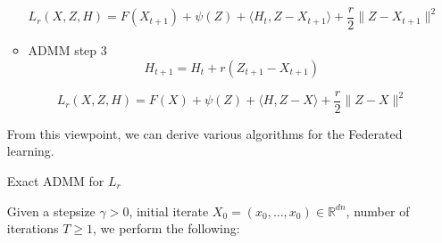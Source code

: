 \begin{itemize}
\begin{itemize}
    \begin{equation}
    L_r(X,Z,H) = F(X_{t+1}) +\psi(Z) + \langle H_t,Z-X_{t+1} \rangle + \frac{r}{2} \|Z-X_{t+1} \|^2
    \end{equation}
    
    \item ADMM step 3
    \begin{equation}
        H_{t+1} = H_t + r (Z_{t+1} - X_{t+1})
    \end{equation}
    
    \begin{equation}
    L_r(X,Z,H) = F(X) +\psi(Z) + \langle H,Z-X \rangle + \frac{r}{2} \|Z-X \|^2
\end{equation}
\end{itemize}

From this viewpoint, we can derive various algorithms for the Federated learning. 

\begin{algorithm}
\caption{Exact ADMM for $L_r$}\label{alg:ADMM exact}
Given a stepsize $\gamma > 0$, initial iterate $X_0 = (x_0, \dots, x_0) \in \mathbb{R}^{dn}$, number of iterations $T \geq 1$, we perform the following:  
\begin{algorithmic}
    
\EndFor
\end{algorithmic}
\end{algorithm}


\end{itemize}

